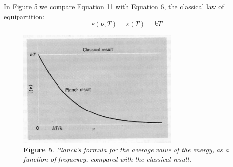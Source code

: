 In Figure 5 we compare Equation 11 with Equation 6, the classical law of
equipartition:
%
\begin{equation*}\tag{6}
\bar{\varepsilon}(\nu, T) = \bar{\varepsilon}(T) = kT %
\end{equation*}
%
%
\begin{figure}[h]
  \begin{center}
  \captionsetup{width=4.15625in}
  \includegraphics[width=3.15625in,height=2.30208in]{images/05_planck/image028.jpg}
  \caption*{\textbf{Figure 5}. \emph{Planck's formula for the average value of the energy,
    as a function of frequency, compared with the classical result.}}
  \end{center}
\end{figure}
%
